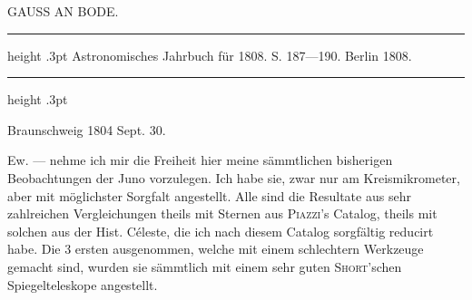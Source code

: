 \begin{flushright}
\end{flushright}

\par\bigskip
{}
\begin{center}
\large GAUSS AN BODE.
\end{center}

\begin{center}
\parbox{.79\linewidth}{%
\centering\fontsize{8.2}{10.2}\selectfont
\hrule height .3pt\relax\vspace{2.5pt}
Astronomisches Jahrbuch für 1808. S. 187—190. Berlin 1808.\par
\vspace{2.5pt}\hrule height .3pt\relax
}
\end{center}

\begin{flushright}
Braunschweig 1804 Sept. 30.
\end{flushright}

\par\indent Ew. --- nehme ich mir die Freiheit hier meine sämmtlichen bisherigen Beobachtungen der Juno vorzulegen. Ich habe sie, zwar nur am Kreismikrometer, aber mit möglichster Sorgfalt angestellt. Alle sind die Resultate aus sehr zahlreichen Vergleichungen theils mit Sternen aus \textsc{Piazzi}'s Catalog, theils mit solchen aus der Hist. Céleste, die ich nach diesem Catalog sorgfältig reducirt habe. Die 3 ersten ausgenommen, welche mit einem schlechtern Werkzeuge gemacht sind, wurden sie sämmtlich mit einem sehr guten \textsc{Short}'schen Spiegelteleskope angestellt.

